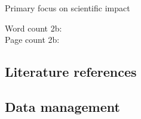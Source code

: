 Primary focus on scientific impact

\countem



\endcountem

\vspace{2em}
Word count 2b:     \thewordcount{}\\
Page count 2b:     \\


\newpage
\subsection{Literature references}\label{sec:ref}

\newrefcontext[sorting=nyt]
\printbibliography[heading=none,notcategory=fullcited]


\newpage
\subsection{Data management}\label{sec:dataman}


